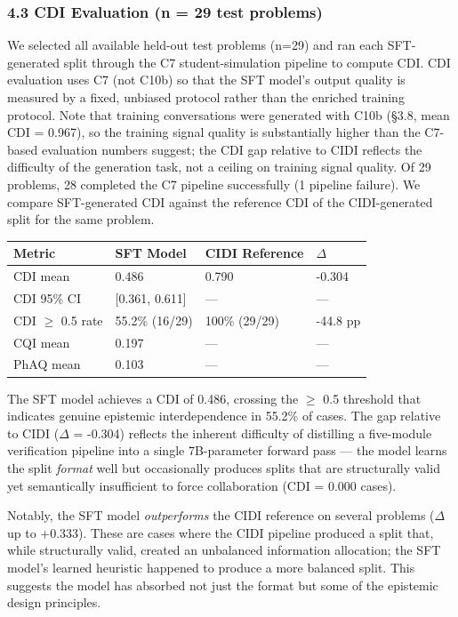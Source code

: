 \documentclass[
  11pt,
]{article}
\newcounter{none} %
\begin{document}
\subsubsection{4.3 CDI Evaluation (n = 29 test
problems)}\label{cdi-evaluation-n-29-test-problems}

We selected all available held-out test problems (n=29) and ran each
SFT-generated split through the C7 student-simulation pipeline to
compute CDI. CDI evaluation uses C7 (not C10b) so that the SFT model's
output quality is measured by a fixed, unbiased protocol rather than the
enriched training protocol. Note that training conversations were
generated with C10b (§3.8, mean CDI = 0.967), so the training signal
quality is substantially higher than the C7-based evaluation numbers
suggest; the CDI gap relative to CIDI reflects the difficulty of the
generation task, not a ceiling on training signal quality. Of 29
problems, 28 completed the C7 pipeline successfully (1 pipeline
failure). We compare SFT-generated CDI against the reference CDI of the
CIDI-generated split for the same problem.

{\def\LTcaptype{none} %
\begin{longtable}[]{@{}llll@{}}
\toprule\noalign{}
Metric & SFT Model & CIDI Reference & $\Delta$ \\
\midrule\noalign{}
\endhead
\bottomrule\noalign{}
\endlastfoot
CDI mean & 0.486 & 0.790 & -0.304 \\
CDI 95\% CI & [0.361, 0.611] & --- & --- \\
CDI $\geq$ 0.5 rate & 55.2\% (16/29) & 100\% (29/29) & -44.8 pp \\
CQI mean & 0.197 & --- & --- \\
PhAQ mean & 0.103 & --- & --- \\
\end{longtable}
}

The SFT model achieves a CDI of 0.486, crossing the $\geq$ 0.5 threshold that
indicates genuine epistemic interdependence in 55.2\% of cases. The gap
relative to CIDI ($\Delta$ = -0.304) reflects the inherent difficulty of
distilling a five-module verification pipeline into a single
7B-parameter forward pass --- the model learns the split \emph{format}
well but occasionally produces splits that are structurally valid yet
semantically insufficient to force collaboration (CDI = 0.000 cases).

Notably, the SFT model \emph{outperforms} the CIDI reference on several
problems ($\Delta$ up to +0.333). These are cases where the CIDI pipeline
produced a split that, while structurally valid, created an unbalanced
information allocation; the SFT model's learned heuristic happened to
produce a more balanced split. This suggests the model has absorbed not
just the format but some of the epistemic design principles.
\end{document}
